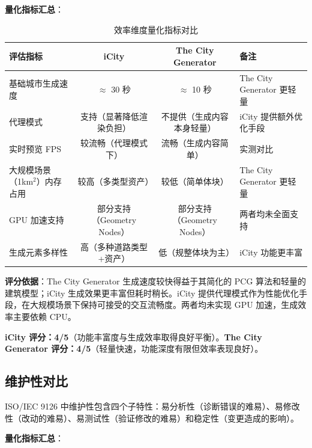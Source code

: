 \documentclass[UTF8,a4paper,10pt]{ctexart}
\begin{document}
\textbf{量化指标汇总}：

\begin{table}[htbp]
\centering
\caption{效率维度量化指标对比}
\label{tab:efficiency_quant}
\begin{tabular}{p{2.5cm}ccX}
\toprule
\textbf{评估指标} & \textbf{iCity} & \textbf{The City Generator} & \textbf{备注} \\
\midrule
基础城市生成速度 & $\approx$ 30 秒 & $\approx$ 10 秒 & The City Generator 更轻量 \\
代理模式 & 支持（显著降低渲染负担） & 不提供（生成内容本身轻量） & iCity 提供额外优化手段 \\
实时预览 FPS & 较流畅（代理模式下） & 流畅（生成内容简单） & 实测对比 \\
大规模场景（1km$^2$）内存占用 & 较高（多类型资产） & 较低（简单体块） & The City Generator 更轻量 \\
GPU 加速支持 & 部分支持（Geometry Nodes） & 部分支持（Geometry Nodes） & 两者均未全面支持 \\
生成元素多样性 & 高（多种道路类型+资产） & 低（规整体块为主） & iCity 功能更丰富 \\
\bottomrule
\end{tabular}
\end{table}

\textbf{评分依据}：The City Generator 生成速度较快得益于其简化的 PCG 算法和轻量的建筑模型；iCity 生成效果更丰富但耗时稍长。iCity 提供代理模式作为性能优化手段，在大规模场景下保持可接受的交互流畅度。两者均未实现 GPU 加速，生成效率主要依赖 CPU。

\textbf{iCity 评分：4/5}（功能丰富度与生成效率取得良好平衡）。\textbf{The City Generator 评分：4/5}（轻量快速，功能深度有限但效率表现良好）。

\subsection{维护性对比}

ISO/IEC 9126 中维护性包含四个子特性：易分析性（诊断错误的难易）、易修改性（改动的难易）、易测试性（验证修改的难易）和稳定性（变更造成的影响）。

\textbf{量化指标汇总}：
\end{document}
